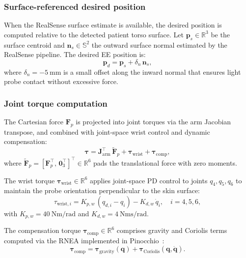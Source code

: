 \subsubsection{Surface-referenced desired position}
When the RealSense surface estimate is available, the desired position is
computed relative to the detected patient torso surface. Let
$\mathbf{p}_s \in \mathbb{R}^3$ be the surface centroid and
$\mathbf{n}_s \in \mathbb{S}^2$ the outward surface normal estimated
by the RealSense pipeline. The desired \ac{EE} position is:
\begin{equation}
  \mathbf{p}_d = \mathbf{p}_s + \delta_n\,\mathbf{n}_s,
  \label{eq:surface_target}
\end{equation}
where $\delta_n = \SI{-5}{\milli\metre}$ is a small offset along the
inward normal that ensures light probe contact without excessive force.

\subsubsection{Joint torque computation}
The Cartesian force $\mathbf{F}_p$ is projected into joint torques via
the arm Jacobian transpose, and combined with joint-space wrist control
and dynamic compensation:
\begin{equation}
  \boldsymbol{\tau} =
  \mathbf{J}_{\mathrm{arm}}^\top\,\tilde{\mathbf{F}}_p
  + \boldsymbol{\tau}_{\mathrm{wrist}}
  + \boldsymbol{\tau}_{\mathrm{comp}},
  \label{eq:torque_total}
\end{equation}
where $\tilde{\mathbf{F}}_p = [\mathbf{F}_p^\top,\,\mathbf{0}_3^\top]^\top
\in \mathbb{R}^6$ pads the translational force with zero moments.

The wrist torque $\boldsymbol{\tau}_{\mathrm{wrist}} \in \mathbb{R}^6$
applies joint-space \ac{PD} control to joints $q_4, q_5, q_6$ to maintain
the probe orientation perpendicular to the skin surface:
\begin{equation}
  \tau_{\mathrm{wrist},i} =
  K_{p,w}\,(q_{d,i} - q_i) - K_{d,w}\,\dot{q}_i,
  \quad i = 4,5,6,
  \label{eq:wrist_torque}
\end{equation}
with $K_{p,w} = \SI{40}{\newton\metre\per\radian}$ and
$K_{d,w} = \SI{4}{\newton\metre\second\per\radian}$.

The compensation torque $\boldsymbol{\tau}_{\mathrm{comp}} \in \mathbb{R}^6$
comprises gravity and Coriolis terms computed via the \acf{RNEA}
implemented in Pinocchio~\cite{carpentier2019}:
\begin{equation}
  \boldsymbol{\tau}_{\mathrm{comp}} =
  \boldsymbol{\tau}_{\mathrm{gravity}}(\mathbf{q})
  + \boldsymbol{\tau}_{\mathrm{Coriolis}}(\mathbf{q}, \dot{\mathbf{q}}).
  \label{eq:compensation}
\end{equation}

